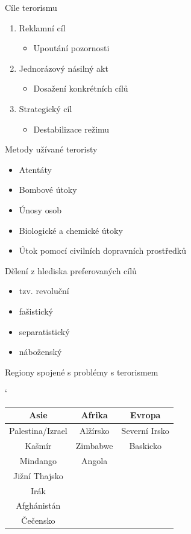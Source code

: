 \documentclass[fyma2,pdf,final]{prosper}
\begin{document}
\begin{slide}{Cíle terorismu}
\begin{enumerate}
	\item Reklamní cíl
		\begin{itemize}
		\item Upoutání pozornosti
		\end{itemize}
	\item Jednorázový násilný akt
		\begin{itemize}
		\item Dosažení konkrétních cílů
		\end{itemize}
	\item Strategický cíl
		\begin{itemize}
		\item Destabilizace režimu
		\end{itemize}
\end{enumerate}
\end{slide}

\begin{slide}{Metody užívané teroristy}
\begin{itemize}
	\item Atentáty 
	\item Bombové útoky
	\item Únosy osob
	\item Biologické a chemické útoky
	\item Útok pomocí civilních dopravních prostředků
\end{itemize}
\end{slide}

\begin{slide}{Dělení z hlediska preferovaných cílů}
\begin{itemize}
	\item tzv. revoluční
	\item fašistický
	\item separatistický
	\item náboženský
\end{itemize}
\end{slide}

\begin{slide}{Regiony spojené s problémy s terorismem}
\begin{table}[h]
\begin{center}
\catcode`
\begin{tabular}{|c|c|c|} \hline
    \textbf{Asie} & \textbf{Afrika} & \textbf{Evropa}\\ \hline
    Palestina/Izrael & Alžírsko & Severní Irsko\\
    Kašmír & Zimbabwe & Baskicko\\
    Mindango & Angola & \\
    Jižní Thajsko &  & \\
    Irák &  & \\
    Afghánistán &  & \\
    Čečensko &  & \\ \hline
\end{tabular}
\end{center}
\end{table}
\end{slide}
\end{document}

